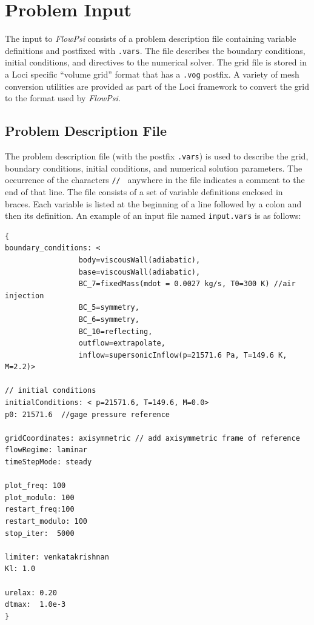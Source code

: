 \documentclass{article}
\begin{document}
\section{Problem Input}

The input to {\em FlowPsi} consists of a problem description file containing
variable definitions and postfixed with {\tt .vars}. The file
describes the boundary conditions, initial conditions, and directives
to the numerical solver. The grid file is stored in a Loci specific
``volume grid'' format that has a {\tt .vog} postfix.  A variety of
mesh conversion utilities are provided as part of the Loci framework
to convert the grid to the format used by {\em FlowPsi}.  

\subsection{Problem Description File}
\label{prob_description_file}

The problem description file (with the postfix {\tt .vars}) is used to
describe the grid, boundary conditions, initial conditions, and
numerical solution parameters.  The occurrence of the characters {\tt // }
anywhere in the file indicates a comment to the end of that line.  The
file consists of a set of variable definitions enclosed in braces.
Each variable is listed at the beginning of a line followed by a colon
and then its definition.  An example of an input file
named {\tt input.vars} is as follows:
\begin{verbatim}
{
boundary_conditions: <
                 body=viscousWall(adiabatic),
                 base=viscousWall(adiabatic),
                 BC_7=fixedMass(mdot = 0.0027 kg/s, T0=300 K) //air injection
                 BC_5=symmetry,
                 BC_6=symmetry,
                 BC_10=reflecting,
                 outflow=extrapolate,
                 inflow=supersonicInflow(p=21571.6 Pa, T=149.6 K, M=2.2)>

// initial conditions
initialConditions: < p=21571.6, T=149.6, M=0.0>
p0: 21571.6  //gage pressure reference

gridCoordinates: axisymmetric // add axisymmetric frame of reference
flowRegime: laminar
timeStepMode: steady 

plot_freq: 100
plot_modulo: 100
restart_freq:100
restart_modulo: 100
stop_iter:  5000

limiter: venkatakrishnan
Kl: 1.0

urelax: 0.20
dtmax:  1.0e-3
}
\end{verbatim} 
\end{document}
